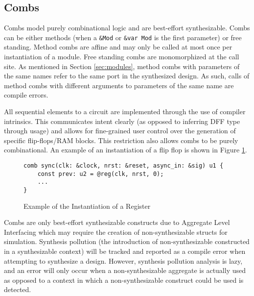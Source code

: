 \documentclass[10pt]{article}
\begin{document}
\subsection{Combs}
Combs model purely combinational logic and are best-effort synthesizable. Combs can be either
methods (when a \verb|&Mod| or \verb|&var Mod| is the first parameter) or free standing. Method
combs are affine and may only be called at most once per instantiation of a module. Free standing
combs are monomorphized at the call site. As mentioned in Section \ref{sec:modules}, method combs
with parameters of the same names refer to the same port in the synthesized design. As such, calls
of method combs with different arguments to parameters of the same name are compile errors.

\begin{mdframed}[frametitle=A Note on Sequential Elements]
	All sequential elements to a circuit are implemented through the use of compiler intrinsics. This
	communicates intent clearly (as opposed to inferring DFF type through usage) and allows for
	fine-grained user control over the generation of specific flip-flops/RAM blocks. This restriction
	also allows combs to be purely combinational. An example of an instantiation of a flip flop is shown
	in Figure \ref{fig:seq_example}.

	\begin{figure}[H]
		\begin{verbatim}
comb sync(clk: &clock, nrst: &reset, async_in: &sig) u1 {
    const prev: u2 = @reg(clk, nrst, 0);
    ...
}
    \end{verbatim}
		\vspace*{-10mm}
		\caption{Example of the Instantiation of a Register}
		\label{fig:seq_example}
	\end{figure}
\end{mdframed}

\begin{mdframed}[frametitle=A Note on the Synthesizability of Combs]
	Combs are only best-effort synthesizable constructs due to Aggregate Level Interfacing which may
	require the creation of non-synthesizable structs for simulation. Synthesis pollution (the
	introduction of non-synthesizable constructed in a synthesizable context) will be tracked and
	reported as a compile error when attempting to synthesize a design. However, synthesis pollution
	analysis is lazy, and an error will only occur when a non-synthesizable aggregate is actually
	used as opposed to a context in which a non-synthesizable construct could be used is detected.
\end{mdframed}
\end{document}
